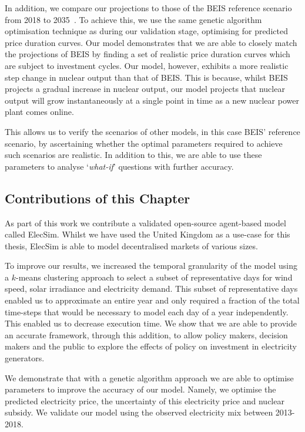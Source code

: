 In addition, we compare our projections to those of the BEIS reference scenario from 2018 to 2035~\cite{DBEIS2019}. To achieve this, we use the same genetic algorithm optimisation technique as during our validation stage, optimising for predicted price duration curves. Our model demonstrates that we are able to closely match the projections of BEIS by finding a set of realistic price duration curves which are subject to investment cycles. Our model, however, exhibits a more realistic step change in nuclear output than that of BEIS. This is because, whilst BEIS projects a gradual increase in nuclear output, our model projects that nuclear output will grow instantaneously at a single point in time as a new nuclear power plant comes online. 

This allows us to verify the scenarios of other models, in this case BEIS' reference scenario, by ascertaining whether the optimal parameters required to achieve such scenarios are realistic. In addition to this, we are able to use these parameters to analyse `\textit{what-if}' questions with further accuracy.


\subsection{Contributions of this Chapter}

As part of this work we contribute a validated open-source agent-based model called ElecSim. Whilst we have used the United Kingdom as a use-case for this thesis, ElecSim is able to model decentralised markets of various sizes. 

To improve our results, we increased the temporal granularity of the model using a $k$-means clustering approach to select a subset of representative days for wind speed, solar irradiance and electricity demand. This subset of representative days enabled us to approximate an entire year and only required a fraction of the total time-steps that would be necessary to model each day of a year independently. This enabled us to decrease execution time. We show that we are able to provide an accurate framework, through this addition, to allow policy makers, decision makers and the public to explore the effects of policy on investment in electricity generators. 

We demonstrate that with a genetic algorithm approach we are able to optimise parameters to improve the accuracy of our model. Namely, we optimise the predicted electricity price, the uncertainty of this electricity price and nuclear subsidy. We validate our model using the observed electricity mix between 2013-2018.


